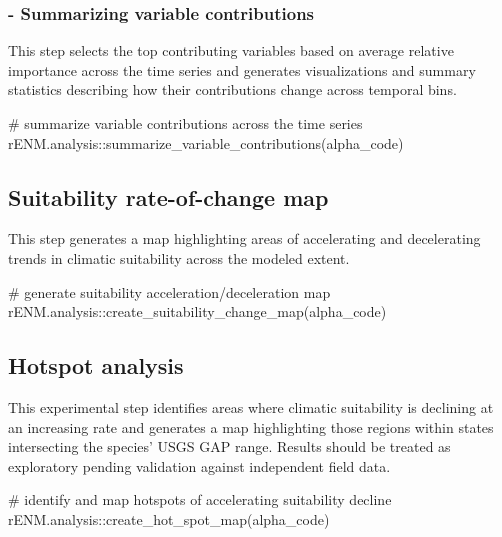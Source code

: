 \documentclass[
  letterpaper,
  DIV=11,
  numbers=noendperiod]{scrartcl}
\newenvironment{Shaded}{\begin{snugshade}}{\end{snugshade}}
\newcommand{\CommentTok}[1]{\textcolor[rgb]{0.37,0.37,0.37}{#1}}
\newcommand{\FunctionTok}[1]{\textcolor[rgb]{0.28,0.35,0.67}{#1}}
\newcommand{\NormalTok}[1]{\textcolor[rgb]{0.00,0.23,0.31}{#1}}
\newcommand{\SpecialCharTok}[1]{\textcolor[rgb]{0.37,0.37,0.37}{#1}}
\begin{document}
\subsubsection{- Summarizing variable
contributions}\label{summarizing-variable-contributions}

This step selects the top contributing variables based on average
relative importance across the time series and generates visualizations
and summary statistics describing how their contributions change across
temporal bins.

\begin{Shaded}
\begin{Highlighting}[]
\CommentTok{\# summarize variable contributions across the time series}
\NormalTok{rENM.analysis}\SpecialCharTok{::}\FunctionTok{summarize\_variable\_contributions}\NormalTok{(alpha\_code)}
\end{Highlighting}
\end{Shaded}

\subsection{Suitability rate-of-change
map}\label{suitability-rate-of-change-map}

This step generates a map highlighting areas of accelerating and
decelerating trends in climatic suitability across the modeled extent.

\begin{Shaded}
\begin{Highlighting}[]
\CommentTok{\# generate suitability acceleration/deceleration map}
\NormalTok{rENM.analysis}\SpecialCharTok{::}\FunctionTok{create\_suitability\_change\_map}\NormalTok{(alpha\_code)}
\end{Highlighting}
\end{Shaded}

\subsection{Hotspot analysis}\label{hotspot-analysis}

This experimental step identifies areas where climatic suitability is
declining at an increasing rate and generates a map highlighting those
regions within states intersecting the species' USGS GAP range. Results
should be treated as exploratory pending validation against independent
field data.

\begin{Shaded}
\begin{Highlighting}[]
\CommentTok{\# identify and map hotspots of accelerating suitability decline}
\NormalTok{rENM.analysis}\SpecialCharTok{::}\FunctionTok{create\_hot\_spot\_map}\NormalTok{(alpha\_code)}
\end{Highlighting}
\end{Shaded}
\end{document}
